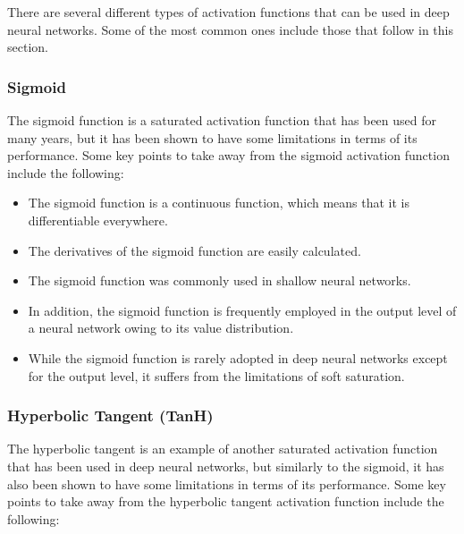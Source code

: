There are several different types of activation functions that can be used in deep neural networks. Some of the most common ones include those that follow in this section.

\subsubsection{Sigmoid}\label{ssec:sigmoid}
    
The sigmoid function is a saturated activation function that has been used for many years, but it has been shown to have some limitations in terms of its performance. Some key points to take away from the sigmoid activation function include the following:

\begin{itemize}
    \item The sigmoid function is a continuous function, which means that it is differentiable everywhere.
    \item The derivatives of the sigmoid function are easily calculated.
    \item The sigmoid function was commonly used in shallow neural networks.
    \item In addition, the sigmoid function is frequently employed in the output level of a neural network owing to its value distribution.
    \item While the sigmoid function is rarely adopted in deep neural networks except for the output level, it suffers from the limitations of soft saturation.
\end{itemize}

\subsubsection{Hyperbolic Tangent (TanH)}\label{ssec:hyperbolic_tangent}

The hyperbolic tangent is an example of another saturated activation function that has been used in deep neural networks, but similarly to the sigmoid, it has also been shown to have some limitations in terms of its performance. Some key points to take away from the hyperbolic tangent activation function include the following:

